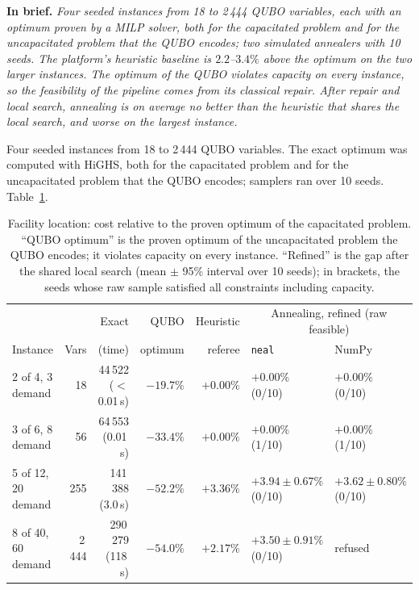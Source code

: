 \documentclass[11pt,a4paper]{article}
\newcommand{\inbrief}[1]{\par\smallskip\noindent\textbf{In brief.} \emph{#1}\par\medskip}
\begin{document}
\inbrief{Four seeded instances from 18 to 2\,444 QUBO variables, each with
an optimum proven by a MILP solver, both for the capacitated problem and for
the uncapacitated problem that the QUBO encodes; two simulated annealers
with 10 seeds. The platform's heuristic baseline is $2.2$--$3.4\%$ above the
optimum on the two larger instances. The optimum of the QUBO violates
capacity on every instance, so the feasibility of the pipeline comes from
its classical repair. After repair and local search, annealing is on average
no better than the heuristic that shares the local search, and worse on the
largest instance.}

Four seeded instances from 18 to 2\,444 QUBO variables. The exact optimum was
computed with HiGHS, both for the capacitated problem and for the
uncapacitated problem that the QUBO encodes; samplers ran over 10 seeds.
Table~\ref{tab:cflp}.

\begin{table}[H]
\centering\footnotesize\setlength{\tabcolsep}{3pt}
\begin{tabular}{lrrrrll}
\toprule
 & & Exact & QUBO & Heuristic & \multicolumn{2}{c}{Annealing, refined (raw feasible)} \\
Instance & Vars & (time) & optimum & referee & \texttt{neal} & NumPy \\
\midrule
2 of 4, 3 demand & 18 & 44\,522 ($<$0.01\,s) & $-19.7\%$ & $+0.00\%$ & $+0.00\%$ (0/10) & $+0.00\%$ (0/10) \\
3 of 6, 8 demand & 56 & 64\,553 (0.01\,s) & $-33.4\%$ & $+0.00\%$ & $+0.00\%$ (1/10) & $+0.00\%$ (1/10) \\
5 of 12, 20 demand & 255 & 141\,388 (3.0\,s) & $-52.2\%$ & $+3.36\%$ & $+3.94 \pm 0.67\%$ (0/10) & $+3.62 \pm 0.80\%$ (0/10) \\
8 of 40, 60 demand & 2\,444 & 290\,279 (118\,s) & $-54.0\%$ & $+2.17\%$ & $+3.50 \pm 0.91\%$ (0/10) & refused \\
\bottomrule
\end{tabular}
\caption{Facility location: cost relative to the proven optimum of the
capacitated problem. ``QUBO optimum'' is the proven optimum of the
uncapacitated problem the QUBO encodes; it violates capacity on every
instance. ``Refined'' is the gap after the shared local search (mean $\pm$
95\% interval over 10 seeds); in brackets, the seeds whose raw sample
satisfied all constraints including capacity.}
\label{tab:cflp}
\end{table}
\end{document}
